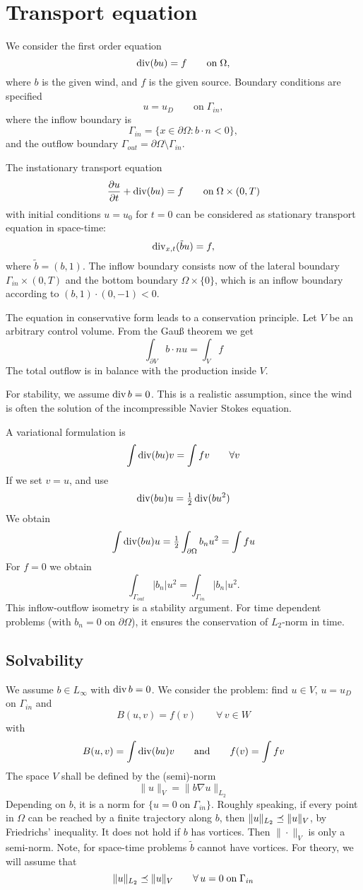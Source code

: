 \section{Transport equation}
We consider the first order equation
$$
\operatorname{div} (bu) = f  \qquad \text{on}  \; \Omega,
$$
where $b$ is the given wind, and $f$ is the given source.
Boundary conditions are specified
$$
u = u_D \qquad \text{on} \; \Gamma_{in},
$$
where the inflow boundary is 
$$
\Gamma_{in} = \{ x \in \partial \Omega : b \cdot n < 0 \},
$$
and the outflow boundary $\Gamma_{out} = \partial \Omega \setminus
\Gamma_{in}$.

The instationary transport equation
$$
\frac{\partial u}{\partial t}  + \operatorname{div} (bu) = f  \qquad \text{on}  \;
\Omega \times (0,T)
$$
with initial conditions $u = u_0$ for $t = 0$ can be considered as
stationary transport equation in space-time:
$$
\operatorname{div}_{x,t} (\tilde b u) = f,
$$
where $\tilde b = (b, 1)$. The inflow boundary consists now of the
lateral boundary $\Gamma_{in} \times (0,T)$ and the bottom
 boundary  $\Omega \times \{0 \}$, which is an inflow boundary according
 to $(b, 1) \cdot (0,-1) < 0$.


The equation in conservative form leads to a conservation
principle. Let $V$ be an arbitrary control volume. From the Gau\ss{}
theorem we get
$$
\int_{\partial V} b\cdot n u = \int_V f
$$
The total outflow is in balance with the production inside $V$.


For stability, we assume $\operatorname{div} b = 0$.  This is a realistic
assumption, since the wind is often the solution of the
incompressible Navier Stokes equation.

A variational formulation is
$$
\int \operatorname{div} (bu) v = \int f v \qquad \forall v 
$$
If we set $v = u$, and use
$$
\operatorname{div} (bu) u =  \tfrac{1}{2} \operatorname{div} (b u^2)
$$
We obtain
$$
\int \operatorname{div} (b u) u = \tfrac{1}{2} \int_{\partial \Omega} b_n u^2 =
\int f u
$$
For $f = 0$ we obtain 
$$
\int_{\Gamma_{out}} |b_n| u^2 = \int_{\Gamma_{in}} | b_n | u^2.
$$
This inflow-outflow isometry is a stability argument. For time dependent problems
(with $b_n = 0$ on $\partial \Omega$), it ensures the conservation of
$L_2$-norm in time.

\subsection{Solvability}

We assume $b \in L_\infty$ with $\operatorname{div} b = 0$. We consider the problem: find $u \in V$,
$u = u_D$ on $\Gamma_{in}$ and 
$$
B(u,v) = f(v) \qquad \forall \, v \in W
$$
with 
$$
B(u,v) = \int \operatorname{div} (bu) v \qquad \text{and} \qquad f(v) = \int f v 
$$
The space $V$ shall be defined by the (semi)-norm
$$
\| u \|_V = \| b \nabla u \|_{L_2}
$$
Depending on $b$, it is a norm for $\{ u = 0 \; \text{on} \; \Gamma_{in}
\}$. Roughly speaking, if every point in $\Omega$ can be reached by a
finite trajectory along $b$, then $\| u \|_{L_2} \preceq \| u \|_V$, by
Friedrichs' inequality. It does not hold if $b$ has vortices. Then
$\| \cdot \|_V$ is only a semi-norm. Note, for space-time problems
$\tilde b$ cannot have vortices. For theory, we will assume that
$$
\| u \|_{L_2} \preceq \| u \|_V \qquad \forall \, u = 0 \; \text{on} \; \Gamma_{in}
$$

